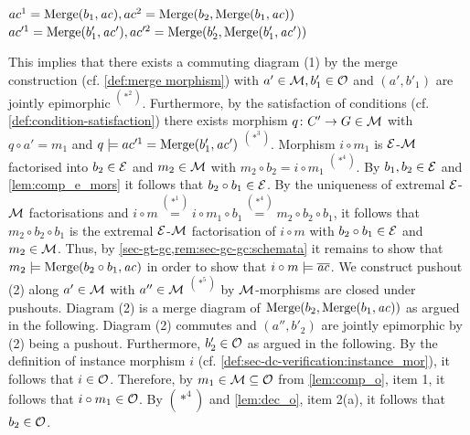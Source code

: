 \begin{description}
\begin{description}
\begin{center}
$ac^1=\mathrm{Merge}(b_1,\mathit{ac}),ac^2=\mathrm{Merge}(b_2,\mathrm{Merge}(b_1,\mathit{ac}))$
$ac'^1=\mathrm{Merge}(b'_1,\mathit{ac}'),ac'^2=\mathrm{Merge}(b'_2,\mathrm{Merge}(b'_1,\mathit{ac}'))$
\end{center}
This implies that there exists a commuting diagram (1) by the merge construction (cf. \cref{def:merge morphism}) with $a' \in {\cal M},b'_1 \in {\cal O}$ and $(a',b'_1)$ are jointly epimorphic $^{(*^2)}$.
Furthermore, by the satisfaction of conditions (cf. \cref{def:condition-satisfaction}) there exists morphism $q\colon C' \to G \in {\cal M}$ with $q \circ a' = m_1$ and $q \models ac'^1=\mathrm{Merge}(b'_1,\mathit{ac}')$ $^{(*^3)}$.
Morphism $i \circ m_1$ is $\mathcal{E}$-${\cal M}$ factorised into $b_2 \in \mathcal{E}$ and $m_2 \in {\cal M}$ with $m_2 \circ b_2=i \circ m_1$ $^{(*^4)}$.
By $b_1,b_2 \in \mathcal{E}$ and \cref{lem:comp_e_mors} it follows that $b_2 \circ b_1 \in \mathcal{E}$.
By the uniqueness of extremal $\mathcal{E}$-${\cal M}$ factorisations and $i \circ m \stackrel{(*^1)}{=} i \circ m_1 \circ b_1 \stackrel{(*^4)}{=} m_2 \circ b_2 \circ b_1$, it follows that $m_2 \circ b_2 \circ b_1$ is the extremal $\mathcal{E}$-${\cal M}$ factorisation of $i \circ m$ with $b_2 \circ b_1 \in \mathcal{E}$ and $m_2 \in {\cal M}$.
Thus, by \cref{sec-gt-gc,rem:sec-gc-gc:schemata} it remains to show that $m_2 \models \mathrm{Merge}(b_2 \circ b_1,\mathit{ac})$ in order to show that $i \circ m \models \overline{\mathit{ac}}$.
We construct pushout (2) along $a' \in {\cal M}$ with $a'' \in {\cal M}$ $^{(*^5)}$ by ${\cal M}$-morphisms are closed under pushouts.
Diagram (2) is a merge diagram of $\mathrm{Merge}(b_2,\mathrm{Merge}(b_1,\mathit{ac}))$ as argued in the following.
Diagram (2) commutes and $(a'',b'_2)$ are jointly epimorphic by (2) being a pushout.
Furthermore, $b'_2 \in {\cal O}$ as argued in the following.
By the definition of instance morphism $i$ (cf. \cref{def:sec-dc-verification:instance_mor}), it follows that $i \in {\cal O}$.
Therefore, by $m_1 \in {\cal M} \subseteq {\cal O}$ from \cref{lem:comp_o}, item 1, it follows that $i \circ m_1 \in {\cal O}$.
By $(*^4)$ and \cref{lem:dec_o}, item 2(a), it follows that $b_2 \in {\cal O}$.

\end{description}
\end{description}
